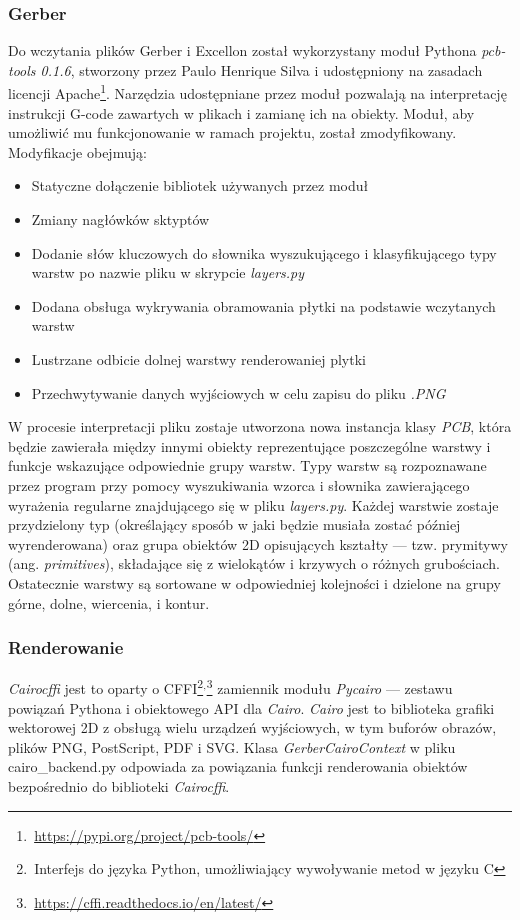 \documentclass{xmgr}
\begin{document}
\subsubsection{Gerber}
Do wczytania plików Gerber i Excellon został wykorzystany moduł Pythona \emph{pcb-tools 0.1.6}, stworzony przez Paulo Henrique Silva i udostępniony na zasadach licencji Apache\footnote{\,\url{https://pypi.org/project/pcb-tools/}}. Narzędzia udostępniane przez moduł pozwalają na interpretację instrukcji G-code zawartych w plikach i zamianę ich na obiekty. Moduł, aby umożliwić mu funkcjonowanie w ramach projektu, został zmodyfikowany. Modyfikacje obejmują:
\begin{itemize}
\item Statyczne dołączenie bibliotek używanych przez moduł
\item Zmiany nagłówków sktyptów
\item Dodanie słów kluczowych do słownika wyszukującego i klasyfikującego typy warstw po nazwie pliku w skrypcie \emph{layers.py}
\item Dodana obsługa wykrywania obramowania płytki na podstawie wczytanych warstw
\item Lustrzane odbicie dolnej warstwy renderowaniej plytki
\item Przechwytywanie danych wyjściowych w celu zapisu do pliku \emph{.PNG}
\end{itemize} 

W procesie interpretacji pliku zostaje utworzona nowa instancja klasy \emph{PCB}, która będzie zawierała między innymi obiekty reprezentujące poszczególne warstwy i funkcje wskazujące odpowiednie grupy warstw. Typy warstw są rozpoznawane przez program przy pomocy wyszukiwania wzorca i słownika zawierającego wyrażenia regularne znajdującego się w pliku \emph{layers.py}. Każdej warstwie zostaje przydzielony typ (określający sposób w jaki będzie musiała zostać później wyrenderowana) oraz grupa obiektów 2D opisujących kształty --- tzw. prymitywy (ang. \emph{primitives}), składające się z wielokątów i krzywych o różnych grubościach. Ostatecznie warstwy są sortowane w odpowiedniej kolejności i dzielone na grupy górne, dolne, wiercenia, i kontur.

\subsubsection{Renderowanie}
\emph{Cairocffi} jest to oparty o CFFI\footnote{\,Interfejs do języka Python, umożliwiający wywoływanie metod w języku C}$^{,}$\footnote{\,\url{https://cffi.readthedocs.io/en/latest/}} zamiennik modułu \emph{Pycairo} --- zestawu powiązań Pythona i obiektowego API dla \emph{Cairo}. \emph{Cairo} jest to biblioteka grafiki wektorowej 2D z obsługą wielu urządzeń wyjściowych, w tym buforów obrazów, plików PNG, PostScript, PDF i SVG. 
Klasa \emph{GerberCairoContext} w pliku cairo\_backend.py odpowiada za powiązania funkcji renderowania obiektów bezpośrednio do biblioteki \emph{Cairocffi}.
\end{document}
